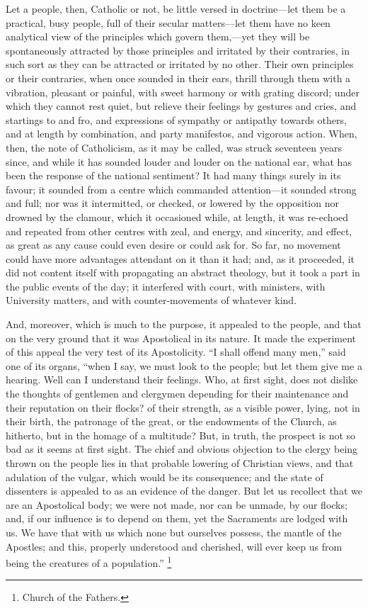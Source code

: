 Let a people, then, Catholic or not, be little versed in doctrine—let
them be a practical, busy people, full of their secular matters—let
them have no keen analytical view of the principles which govern them,—yet
they will be spontaneously attracted by those principles and irritated
by their contraries, in such sort as they can be attracted or
irritated by no other. Their own principles or their contraries, when
once sounded in their ears, thrill through them with a vibration,
pleasant or painful, with sweet harmony or with grating discord; under
which they cannot rest quiet, but relieve their feelings by gestures
and cries, and startings to and fro, and expressions of sympathy or
antipathy towards others, and at length by combination, and party
manifestos, and vigorous action. When, then, the note of Catholicism,
as it may be called, was struck seventeen years since, and while it
has sounded louder and louder on the national ear, what has been the
response of the national sentiment? It had many things surely in its
favour; it sounded from a centre which commanded attention—it
sounded strong and full; nor was it intermitted, or checked, or
lowered by the opposition nor drowned by the clamour, which it
occasioned while, at length, it was re-echoed and repeated from other
centres with zeal, and energy, and sincerity, and effect, as great as
any cause could even desire or could ask for. So far, no movement
could have more advantages attendant on it than it had; and, as it
proceeded, it did not content itself with propagating an abstract
theology, but it took a part in the public events of the day; it
interfered with court, with ministers, with University matters, and
with counter-movements of whatever kind.

And, moreover, which is much to the purpose, it appealed to the
people, and that on the very ground that it was Apostolical in its
nature. It made the experiment of this appeal the very test of its
Apostolicity. ``I shall offend many men,'' said one of its
organs, ``when I say, we must look to the people; but let them
give me a hearing. Well can I understand their feelings. Who, at first
sight, does not dislike the thoughts of gentlemen and clergymen
depending for their maintenance and their reputation on their flocks?
of their strength, as a visible power, lying, not in their birth, the
patronage of the great, or the endowments of the Church, as hitherto,
but in the homage of a multitude? But, in truth, the prospect is not
so bad as it seems at first sight. The chief and obvious objection to
the clergy being thrown on the people lies in that probable lowering
of Christian views, and that adulation of the vulgar, which would be
its consequence; and the state of dissenters is appealed to as an
evidence of the danger. But let us recollect that we are an
Apostolical body; we were not made, nor can be unmade, by our flocks;
and, if our influence is to depend on them, yet the Sacraments are
lodged with us. We have that with us which none but ourselves possess,
the mantle of the Apostles; and this, properly understood and
cherished, will ever keep us from being the creatures of a
population.'' \footnote{Church of the Fathers.}

